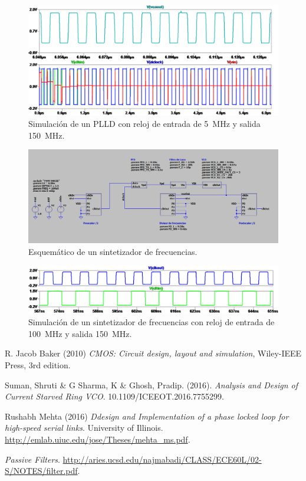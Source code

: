 \documentclass[a4paper]{article}
\begin{document}
\begin{figure}[!htb]
\centering
\includegraphics[scale=0.4]{./img/pfd_plld_5Min_150Mout}
\caption{Simulación de un PLLD con reloj de entrada de \SI{5}{\mega\hertz} y salida \SI{150}{\mega\hertz}.}
\label{fig:pfd_plld_5Min_150Mout}
\end{figure}

\begin{figure}[!htb]
\centering
\includegraphics[scale=0.4]{./img/freq_synth_sch}
\caption{Esquemático de un sintetizador de frecuencias.}
\label{fig:freq_synth_sch}
\end{figure}

\begin{figure}[!htb]
\centering
\includegraphics[scale=0.4]{./img/freq_synth_100Min_150Mout}
\caption{Simulación de un sintetizador de frecuencias con reloj de entrada de \SI{100}{\mega\hertz} y salida \SI{150}{\mega\hertz}.}
\label{fig:freq_synth_100Min_150Mout}
\end{figure}

\begin{thebibliography}{9}

R. Jacob Baker (2010) \emph{CMOS: Circuit design, layout and simulation}, Wiley-IEEE Press, 3rd edition.

Suman, Shruti \& G Sharma, K \& Ghosh, Pradip. (2016). \emph{Analysis and Design of Current Starved Ring VCO}. 10.1109/ICEEOT.2016.7755299.

Rushabh Mehta (2016) \emph{Ddesign and Implementation of a phase locked loop for high-speed serial links}. University of Illinois. \url{http://emlab.uiuc.edu/jose/Theses/mehta_ms.pdf}.

\emph{Passive Filters}. \url{http://aries.ucsd.edu/najmabadi/CLASS/ECE60L/02-S/NOTES/filter.pdf}.

\end{thebibliography}
\end{document}
